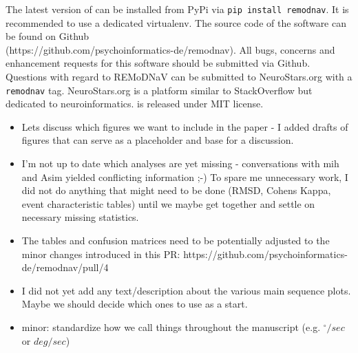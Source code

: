 The latest version of \remodnav can be installed from PyPi via \texttt{pip
install remodnav}. It is recommended to use a dedicated virtualenv. The source
code of the software can be found on Github \\
(https://github.com/psychoinformatics-de/remodnav). All bugs, concerns and
enhancement requests for this software should be submitted via Github.
Questions with regard to REMoDNaV can be submitted to NeuroStars.org with a
\texttt{remodnav} tag. NeuroStars.org is a platform similar to StackOverflow
but dedicated to neuroinformatics.  \remodnav is released under MIT license.


\begin{itemize}
\item Lets discuss which figures we want to include in the paper - I added drafts of figures that can serve as a placeholder and base for a discussion.
\item I'm not up to date which analyses are yet missing - conversations with mih and Asim yielded conflicting information ;-) To spare me unnecessary work, I did not do anything that might need to be done (RMSD, Cohens Kappa, event characteristic tables) until we maybe get together and settle on necessary missing statistics.
\item The tables and confusion matrices need to be potentially adjusted to the minor changes introduced in this PR: https://github.com/psychoinformatics-de/remodnav/pull/4
\item I did not yet add any text/description about the various main sequence plots. Maybe we should decide which ones to use as a start.
\item minor: standardize how we call things throughout the manuscript (e.g. $^\circ/sec$ or $deg/sec$)
\end{itemize}





